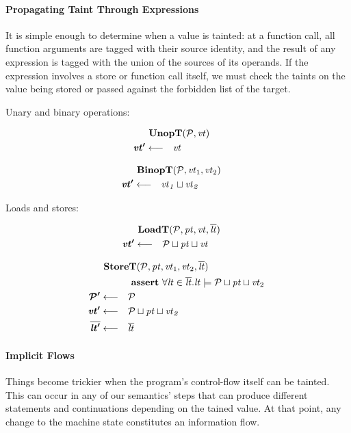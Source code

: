 \documentclass[acmsmall,review,anonymous]{acmart}\settopmatter{printfolios=true,printccs=false,printacmref=false}
\begin{document}
\paragraph{Propagating Taint Through Expressions}

It is simple enough to determine when a value is tainted: at a function
call, all function arguments are tagged with their source identity, and the result
of any expression is tagged with the union of the sources of its operands. If the
expression involves a store or function call itself, we must check the taints on
the value being stored or passed against the forbidden list of the target.

Unary and binary operations:

\begin{minipage}[t]{.49\textwidth}
  \[\begin{aligned}
  \truledef{\unopt}
  \settag{\vt'}{\vt}
  \end{aligned}\]
\end{minipage}
\begin{minipage}[t]{.49\textwidth}
  \[\begin{aligned}
  \truledef{\binopt}
  \settag{\vt'}{
    \vt_1 \sqcup \vt_2
  }
  \end{aligned}\]
\end{minipage}

Loads and stores:

\begin{minipage}[t]{.4\textwidth}
\[\begin{aligned}
\truledef{\loadt}
\settag{\vt'}{\PCT \sqcup \pt \sqcup \vt}
\end{aligned}\]
\end{minipage}
\begin{minipage}[t]{.59\textwidth}
\[\begin{aligned}
\truledef{\storet}
\assert{\forall \lt \in \overline{\lt} . \lt \models \PCT \sqcup \pt \sqcup \vt_2}
\settag{\PCT'}{\PCT}
\settag{\vt'}{\PCT \sqcup \pt \sqcup \vt_2}
\settag{\overline{\lt'}}{\overline{\lt}}
\end{aligned}\]
\end{minipage}

\paragraph{Implicit Flows}

Things become trickier when the program's control-flow itself can be tainted. This can occur in
any of our semantics' steps that can produce different statements and continuations
depending on the tained value. At that point, any change to the machine state constitutes
an information flow.
\end{document}
